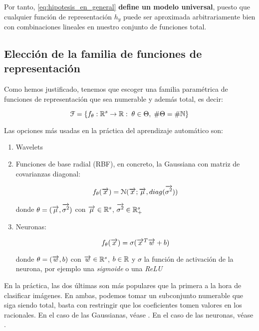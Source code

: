 Por tanto, \eqref{eq:hipotesis_en_general} \textbf{define un modelo universal}, puesto que cualquier función de representación $h_y$ puede ser aproximada arbitrariamente bien con combinaciones lineales en nuestro conjunto de funciones total.

\subsection{Elección de la familia de funciones de representación}

Como hemos justificado, tenemos que escoger una familia paramétrica de funciones de representación que sea numerable y además total, es decir:

\begin{equation}
    \mathcal{F} = \{  f_{\theta}: \mathbb{R}^s \to \mathbb{R}: \; \theta \in \Theta, \; \# \Theta = \# \mathbb{N}  \}
\end{equation}

Las opciones más usadas en la práctica del aprendizaje automático son:

\begin{enumerate}
    \item Wavelets
    \item Funciones de base radial (RBF), en concreto, la Gaussiana con matriz de covarianzas diagonal:

        \begin{equation}
            f_\theta(\overrightarrow{x}) = \mathcal{N}(\overrightarrow{x}; \overrightarrow{\mu}, diag(\overrightarrow{\sigma^2}))
        \end{equation}

        donde $\theta = (\overrightarrow{\mu}, \overrightarrow{\sigma^2})$ con $\overrightarrow{\mu} \in \mathbb{R}^s$, $\overrightarrow{\sigma^2} \in \mathbb{R}^s_+$

    \item Neuronas:

        \begin{equation}
            f_\theta(\overrightarrow{x}) = \sigma(\overrightarrow{x}^T \overrightarrow{w} + b)
        \end{equation}

        donde $\theta = (\overrightarrow{w}, b)$ con $\overrightarrow{w} \in \mathbb{R}^s$, $b \in \mathbb{R}$ y $\sigma$ la función de activación de la neurona, por ejemplo una \textit{sigmoide} o una \textit{ReLU}


\end{enumerate}

En la práctica, las dos últimas son más populares que la primera a la hora de clasificar imágenes. En ambas, podemos tomar un subconjunto numerable que siga siendo total, basta con restringir que los coeficientes tomen valores en los racionales. En el caso de las Gaussianas, véase \cite{matematicas:gaussianas_totales}. En el caso de las neuronas, véase \cite{matematicas:neuronas_totales}.

